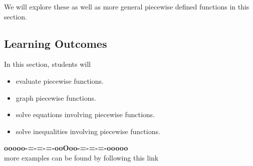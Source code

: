 \documentclass{ximera}
\begin{document}
We will explore these as well as more general piecewise defined functions in this section. 






\subsection*{Learning Outcomes}



\begin{sectionOutcomes}
In this section, students will 

\begin{itemize}
\item evaluate piecewise functions.
\item graph piecewise functions.
\item solve equations involving piecewise functions.
\item solve inequalities involving piecewise functions.
\end{itemize}
\end{sectionOutcomes}



















\begin{onlineOnly}
\begin{center}
\textbf{\textcolor{green!50!black}{ooooo-=-=-=-ooOoo-=-=-=-ooooo}} \\

more examples can be found by following this link\\ 

\end{center}
\end{onlineOnly}
\end{document}
